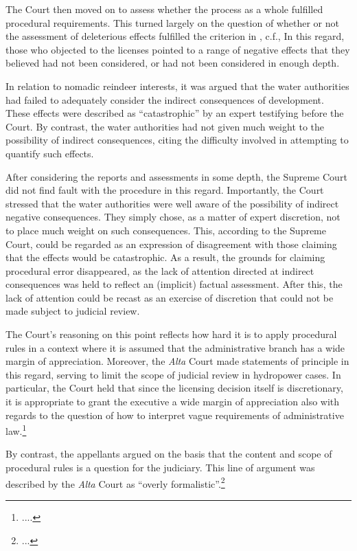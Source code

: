 The Court then moved on to assess whether the process as a whole fulfilled procedural requirements. This turned largely on the question of whether or not the assessment of deleterious effects fulfilled the criterion in \cite[8]{wra17}, c.f., \cite[16]{paa67} In this regard, those who objected to the licenses pointed to a range of negative effects that they believed had not been considered, or had not been considered in enough depth. 

In relation to nomadic reindeer interests,  it was argued that the water authorities had failed to adequately consider the indirect consequences of development. These effects were described as ``catastrophic'' by an expert testifying before the Court. By contrast, the water authorities had not given much weight to the possibility of indirect consequences, citing the difficulty involved in attempting to quantify such effects.

After considering the reports and assessments in some depth, the Supreme Court did not find fault with the procedure in this regard. Importantly, the Court stressed that the water authorities were well aware of the possibility of indirect negative consequences. They simply chose, as a matter of expert discretion, not to place much weight on such consequences. This, according to the Supreme Court, could be regarded as an expression of disagreement with those claiming that the effects would be catastrophic. As a result, the grounds for claiming procedural error disappeared, as the lack of attention directed at indirect consequences was held to reflect an (implicit) factual assessment. After this, the lack of attention could be recast as an exercise of discretion that could not be made subject to judicial review.

The Court's reasoning on this point reflects how hard it is to apply procedural rules in a context where it is assumed that the administrative branch has a wide margin of appreciation. Moreover, the {\it Alta} Court made statements of principle in this regard, serving to limit the scope of judicial review in hydropower cases. In particular, the Court held that since the licensing decision itself is discretionary, it is appropriate to grant the executive a wide margin of appreciation also with regards to the question of how to interpret vague requirements of administrative law.\footnote{....}

By contrast, the appellants argued on the basis that the content and scope of procedural rules is a question for the judiciary. This line of argument was described by the {\it Alta} Court as ``overly formalistic''.\footnote{...}

